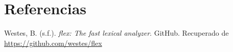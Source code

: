 \documentclass{article}
\begin{document}
\section{Referencias}
\renewcommand{\refname}{}

\begin{thebibliography}{9}

 \label{ref:vidIntro} Westes, B. (s.f.). \textit{flex: The fast lexical analyzer}. GitHub. Recuperado de \url{https://github.com/westes/flex}
\end{thebibliography}
\end{document}
